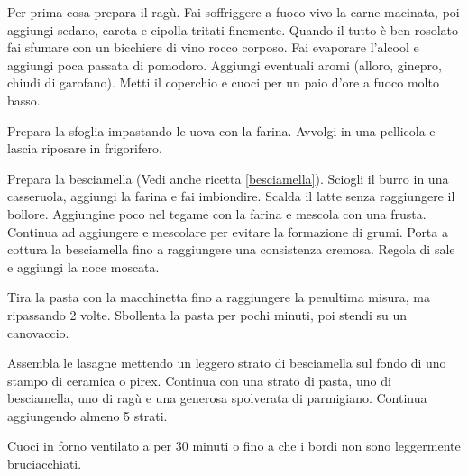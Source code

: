 \begin{method}
Per prima cosa prepara il ragù. Fai soffriggere a fuoco vivo la carne macinata, poi aggiungi sedano, carota e cipolla tritati finemente. Quando il tutto è ben rosolato fai sfumare con un bicchiere di vino rocco corposo. Fai evaporare l'alcool e aggiungi poca passata di pomodoro. Aggiungi eventuali aromi (alloro, ginepro, chiudi di garofano). Metti il coperchio e cuoci per un paio d'ore a fuoco molto basso.

Prepara la sfoglia impastando le uova con la farina. Avvolgi in una pellicola e lascia riposare in frigorifero.

Prepara la besciamella (Vedi anche ricetta \ref{besciamella}). Sciogli il burro in una casseruola, aggiungi la farina e fai imbiondire. Scalda il latte senza raggiungere il bollore. Aggiungine poco nel tegame con la farina e mescola con una frusta. Continua ad aggiungere e mescolare per evitare la formazione di grumi. Porta a cottura la besciamella fino a raggiungere una consistenza cremosa. Regola di sale e aggiungi la noce moscata.

Tira la pasta con la macchinetta fino a raggiungere la penultima misura, ma ripassando 2 volte. Sbollenta la pasta per pochi minuti, poi stendi su un canovaccio.

Assembla le lasagne mettendo un leggero strato di besciamella sul fondo di uno stampo di ceramica o pirex. Continua con una strato di pasta, uno di besciamella, uno di ragù e una generosa spolverata di parmigiano. Continua aggiungendo almeno 5 strati.

Cuoci in forno ventilato a  per 30 minuti o fino a che i bordi non sono leggermente bruciacchiati.


\end{method}




